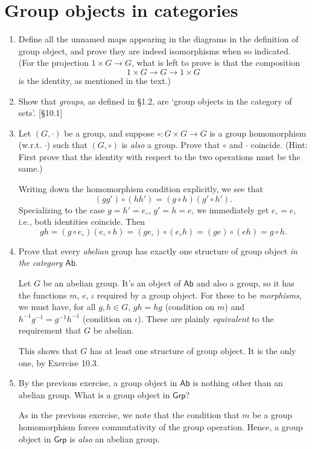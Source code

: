 \section{Group objects in categories}
\begin{enumerate}
    \item Define all the unnamed maps appearing in the diagrams in the definition of group object, and prove they are indeed isomorphisms when so indicated. (For the projection $1 \times G \to G$, what is left to prove is that the composition
          \[ 1 \times G \to G \to 1 \times G \]
          is the identity, as mentioned in the text.)

    \item Show that \emph{groups}, as defined in \S1.2, are `group objects in the category of sets'. [\S10.1]

    \item Let $(G, \cdot)$ be a group, and suppose $\circ: G \times G \to G$ is a group homomorphism (w.r.t. $\cdot$) such that $(G, \circ)$ is \emph{also} a group. Prove that $\circ$ and $\cdot$ coincide. (Hint: First prove that the identity with respect to the two operations must be the same.)
    \begin{solution}
        Writing down the homomorphism condition explicitly, we see that \[ (gg')\circ(hh') = (g\circ h)(g' \circ h'). \]
        Specializing to the case $g = h' = e_\circ$, $g'= h = e$, we immediately get $e_\circ = e$, i.e., both identities coincide. Then \[ gh = (g\circ e_\circ)(e_\circ \circ h) = (g e_\circ) \circ (e_\circ h) = (ge) \circ (eh) = g \circ h. \]
    \end{solution}

    \item Prove that every \emph{abelian} group has exactly one structure of group object \emph{in the category} $\mathsf{Ab}$.
    \begin{solution}
            Let $G$ be an abelian group. It's an object of $\mathsf{Ab}$ and also a group, so it has the functions $m$, $e$, $\iota$ required by a group object. For these to be \emph{morphisms}, we must have, for all $g,h \in G$, $gh = hg$  (condition on $m$) and $h^{-1}g^{-1} = g^{-1}h^{-1}$ (condition on $\iota$). These are plainly \emph{equivalent} to the requirement that $G$ be abelian.

            This shows that $G$ has at least one structure of group object. It is the only one, by Exercise 10.3.
    \end{solution}


    \item By the previous exercise, a group object in $\mathsf{Ab}$ is nothing other than an abelian group. What is a group object in $\mathsf{Grp}$?
    \begin{solution}
        As in the previous exercise, we note that the condition that $m$ be a group homomorphism forces commutativity of the group operation. Hence, a group object in $\mathsf{Grp}$ is \emph{also} an abelian group.
    \end{solution}
\end{enumerate}